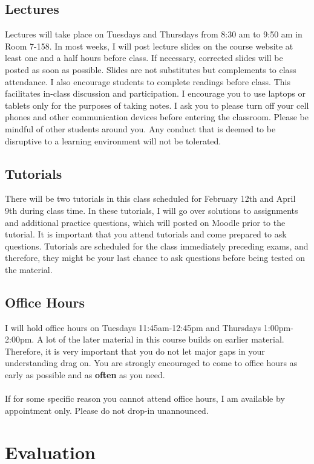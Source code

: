 \documentclass[letterpaper,12pt]{article}
\theoremstyle{dotlessS}
\begin{document}
\subsection*{Lectures}
Lectures will take place on Tuesdays and Thursdays from 8:30 am to 9:50 am in Room 7-158. In most weeks, I will post lecture slides on the course website at least one and a half hours before class. If necessary, corrected slides will be posted as soon as possible. Slides are not substitutes but complements to class attendance. I also encourage students to complete readings before class. This facilitates in-class discussion and participation. I encourage you to use laptops or tablets only for the purposes of taking notes. I ask you to please turn off your cell phones and other communication devices before entering the classroom. Please be mindful of other students around you. Any conduct that is deemed to be disruptive to a learning environment will not be tolerated.  \\ 

\subsection*{Tutorials}
There will be two tutorials in this class scheduled for February 12th and April 9th during class time. In these tutorials, I will go over solutions to assignments and additional practice questions, which will posted on Moodle prior to the tutorial. It is important that you attend tutorials and come prepared to ask questions. Tutorials are scheduled for the class immediately preceding exams, and therefore, they might be your last chance to ask questions before being tested on the material. 

\subsection*{Office Hours}
I will hold office hours on Tuesdays 11:45am-12:45pm and Thursdays 1:00pm-2:00pm. A lot of the later material in this course builds on earlier material. Therefore, it is very important that you do not let major gaps in your understanding drag on. You are strongly encouraged to come to office hours as early as possible and as \textbf{often} as you need.\\
\\
\noindent If for some specific reason you cannot attend office hours, I am available by appointment only. Please do not drop-in unannounced.


\section{Evaluation}
\end{document}
